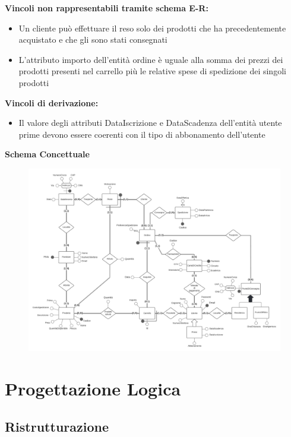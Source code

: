 \documentclass[10pt]{article}
\begin{document}
\textbf{Vincoli non rappresentabili tramite schema E-R:}
\begin{itemize}
    \itemsep0em 
    \item Un cliente può effettuare il reso solo dei prodotti che ha precedentemente acquistato e che gli sono stati consegnati
    \item L'attributo importo dell'entità ordine è uguale alla somma dei prezzi dei prodotti presenti nel carrello più le relative spese di spedizione dei singoli prodotti
\end{itemize}

\textbf{Vincoli di derivazione:}
\begin{itemize}
    \itemsep0em 
    \item Il valore degli attributi DataIscrizione e DataScadenza dell'entità utente prime devono essere coerenti con il tipo di abbonamento dell'utente
\end{itemize}

\begin{center}
    \textbf{Schema Concettuale}
\end{center}

\begin{figure}[H]
    \includegraphics[scale=0.44]{media/SampleAmazonDB.png}
    \label{Schema E-R}
\end{figure}

\section{Progettazione Logica}

\subsection{Ristrutturazione}
\end{document}
